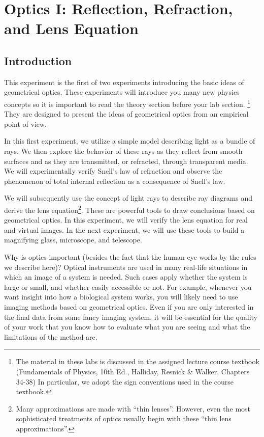 \chapter{Optics I: Reflection, Refraction, and Lens Equation}

\section{Introduction}

This experiment is the first of two experiments introducing the basic ideas of geometrical optics. These experiments will introduce you many new physics concepts so it is important to read the theory section before your lab section. \footnote{The material in these labs is discussed in the assigned lecture course textbook (Fundamentals of Physics, 10th Ed., Halliday, Resnick \& Walker, Chapters 34-38) In particular, we adopt the sign conventions used in the course textbook.}  They are designed to present the ideas of geometrical optics from an empirical point of view.\myskip

In this first experiment, we utilize a simple model describing light as a bundle of rays.  We then explore the behavior of these rays as they reflect from smooth surfaces and as they are transmitted, or refracted, through transparent media.  We will experimentally verify Snell's law of refraction and observe the phenomenon of total internal reflection as a consequence of Snell's law.\myskip

We will subsequently use the concept of light rays to describe ray diagrams and derive the lens equation\footnote{Many approximations are made with ``thin lenses''. However, even the most sophisticated treatments of optics usually begin with these ``thin lens approximations''.}. These are powerful tools to draw conclusions based on geometrical optics. In this experiment, we will verify the lens equation for real and virtual images. In the next experiment, we will use these tools to build a magnifying glass, microscope, and telescope.\myskip

Why is optics important (besides the fact that the human eye works by the rules we describe here)? Optical instruments are used in many real-life situations in which an image of a system is needed.  Such cases apply whether the system is large or small, and whether easily accessible or not.  For example, whenever you want insight into how a biological system works, you will likely need to use imaging methods based on geometrical optics. Even if you are only interested in the final data from some fancy imaging system, it will be essential for the quality of your work that you know how to evaluate what you are seeing and what the limitations of the method are.\myskip

